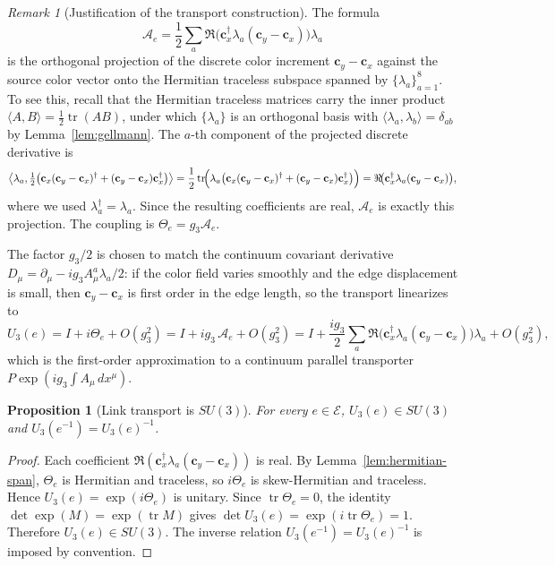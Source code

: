 \documentclass[11pt]{article}
\newtheorem{proposition}[theorem]{Proposition}
\theoremstyle{remark}
\newtheorem{remark}[theorem]{Remark}
\newcommand{\mcE}{\mathcal E}
\newcommand{\tr}{\operatorname{tr}}
\begin{document}
\begin{remark}[Justification of the transport construction]
\label{rem:transport-justification}
The formula
\[
\mathcal A_e=\frac12\sum_a
\Re\!\bigl(\mathbf c_x^\dagger\lambda_a(\mathbf c_y-\mathbf c_x)\bigr)\lambda_a
\]
is the orthogonal projection of the discrete color increment
$\mathbf c_y-\mathbf c_x$ against the source color vector onto the Hermitian
traceless subspace spanned by $\{\lambda_a\}_{a=1}^8$.
To see this, recall that the Hermitian traceless matrices carry the inner
product $\langle A,B\rangle=\frac{1}{2}\tr(AB)$, under which $\{\lambda_a\}$ is
an orthogonal basis with $\langle\lambda_a,\lambda_b\rangle=\delta_{ab}$ by
Lemma~\ref{lem:gellmann}.
The $a$-th component of the projected discrete derivative is
\[
\bigl\langle \lambda_a,\tfrac12\bigl(\mathbf c_x(\mathbf c_y-\mathbf c_x)^\dagger
+(\mathbf c_y-\mathbf c_x)\mathbf c_x^\dagger\bigr)\bigr\rangle
=\frac12\tr\!\Bigl(\lambda_a\bigl(\mathbf c_x(\mathbf c_y-\mathbf c_x)^\dagger
+(\mathbf c_y-\mathbf c_x)\mathbf c_x^\dagger\bigr)\Bigr)
=\Re\!\bigl(\mathbf c_x^\dagger\lambda_a(\mathbf c_y-\mathbf c_x)\bigr),
\]
where we used $\lambda_a^\dagger=\lambda_a$.
Since the resulting coefficients are real, $\mathcal A_e$ is exactly this
projection. The coupling is $\Theta_e=g_3\mathcal A_e$.

The factor $g_3/2$ is chosen to match the continuum covariant derivative
$D_\mu=\partial_\mu-ig_3 A_\mu^a\lambda_a/2$:
if the color field varies smoothly and the edge displacement is small, then
$\mathbf c_y-\mathbf c_x$ is first order in the edge length, so the transport
linearizes to
\[
U_3(e)=I+i\Theta_e+O(g_3^2)
=I+ig_3\,\mathcal A_e+O(g_3^2)
=I+\frac{ig_3}{2}\sum_a
\Re\!\bigl(\mathbf c_x^\dagger\lambda_a(\mathbf c_y-\mathbf c_x)\bigr)\lambda_a
+O(g_3^2),
\]
which is the first-order approximation to a continuum parallel transporter
$P\exp(ig_3\int A_\mu\,dx^\mu)$.
\end{remark}

\begin{proposition}[Link transport is $SU(3)$]
\label{prop:su3-link}
For every $e\in\mcE$, $U_3(e)\in SU(3)$ and $U_3(e^{-1})=U_3(e)^{-1}$.
\end{proposition}
\begin{proof}
Each coefficient $\Re(\mathbf c_x^\dagger\lambda_a(\mathbf c_y-\mathbf c_x))$ is real.
By Lemma~\ref{lem:hermitian-span}, $\Theta_e$ is Hermitian and traceless, so
$i\Theta_e$ is skew-Hermitian and traceless.
Hence $U_3(e)=\exp(i\Theta_e)$ is unitary.
Since $\tr\Theta_e=0$, the identity $\det\exp(M)=\exp(\tr M)$ gives
$\det U_3(e)=\exp(i\tr\Theta_e)=1$.
Therefore $U_3(e)\in SU(3)$.
The inverse relation $U_3(e^{-1})=U_3(e)^{-1}$ is imposed by convention.
\end{proof}
\end{document}
